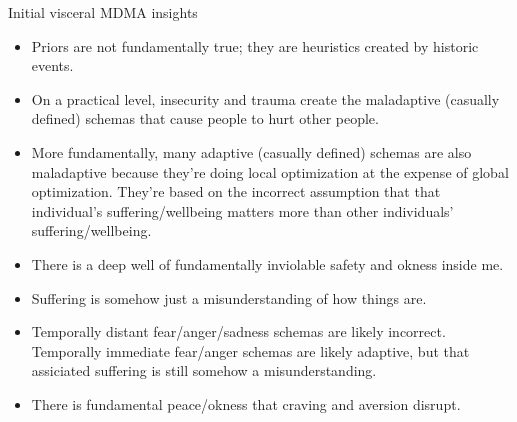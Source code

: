 Initial visceral MDMA insights
\begin{itemize}
    \item Priors are not fundamentally true; they are heuristics created by historic events.
    \item On a practical level, insecurity and trauma create the maladaptive (casually defined) schemas that cause people to hurt other people.
    \item More fundamentally, many adaptive (casually defined) schemas are also maladaptive because they're doing local optimization at the expense of global optimization. They're based on the incorrect assumption that that individual's suffering/wellbeing matters more than other individuals' suffering/wellbeing.
    \item There is a deep well of fundamentally inviolable safety and okness inside me.
    \item Suffering is somehow just a misunderstanding of how things are.
    \item Temporally distant fear/anger/sadness schemas are likely incorrect. Temporally immediate fear/anger schemas are likely adaptive, but that assiciated suffering is still somehow a misunderstanding.
    \item There is fundamental peace/okness that craving and aversion disrupt.
\end{itemize}